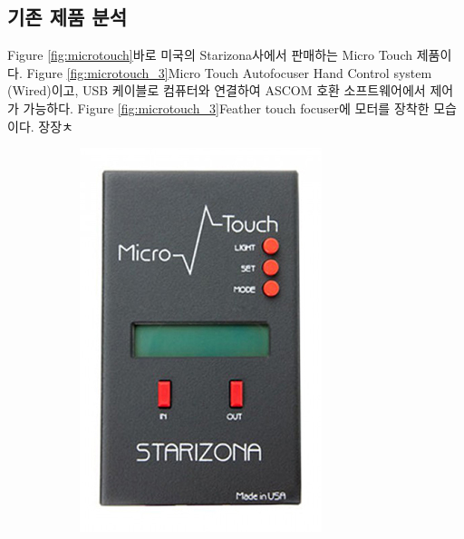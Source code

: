 \subsection{기존 제품 분석}

Figure \ref{fig:microtouch}\가 바로 미국의 Starizona사에서 판매하는 Micro Touch  제품이다. Figure \ref{fig:microtouch_3}\가 Micro Touch Autofocuser Hand Control system (Wired)이고, USB 케이블로 컴퓨터와 연결하여 ASCOM 호환 소프트웨어에서 제어가 가능하다.  Figure \ref{fig:microtouch_3}\는 Feather touch focuser에 모터를 장착한 모습이다. 장장ㅊ


\begin{figure}[h]
	\begin{center}
		\begin{subfigure}{0.45\textwidth}
			\includegraphics[width=0.9\linewidth]{microtouch_3} 

\end{subfigure}
\end{center}
\end{figure}
